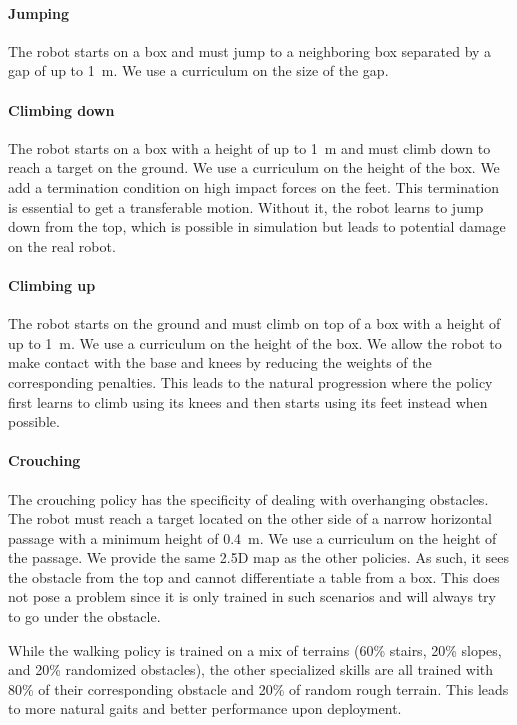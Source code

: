 \documentclass[conference]{IEEEtran}
\begin{document}
\paragraph{Jumping} The robot starts on a box and must jump to a neighboring box separated by a gap of up to \SI{1}{\m}. We use a curriculum on the size of the gap.

\paragraph{Climbing down} The robot starts on a box with a height of up to \SI{1}{\m} and must climb down to reach a target on the ground. We use a curriculum on the height of the box. We add a termination condition on high impact forces on the feet. This termination is essential to get a transferable motion. Without it, the robot learns to jump down from the top, which is possible in simulation but leads to potential damage on the real robot. 

\paragraph{Climbing up} The robot starts on the ground and must climb on top of a box with a height of up to \SI{1}{\m}. We use a curriculum on the height of the box. We allow the robot to make contact with the base and knees by reducing the weights of the corresponding penalties. This leads to the natural progression where the policy first learns to climb using its knees and then starts using its feet instead when possible.

\paragraph{Crouching} The crouching policy has the specificity of dealing with overhanging obstacles. The robot must reach a target located on the other side of a narrow horizontal passage with a minimum height of \SI{0.4}{\m}. We use a curriculum on the height of the passage. We provide the same 2.5D map as the other policies. As such, it sees the obstacle from the top and cannot differentiate a table from a box. This does not pose a problem since it is only trained in such scenarios and will always try to go under the obstacle.

While the walking policy is trained on a mix of terrains (60\% stairs, 20\% slopes, and 20\% randomized obstacles), the other specialized skills are all trained with 80\% of their corresponding obstacle and 20\% of random rough terrain. This leads to more natural gaits and better performance upon deployment.
\end{document}
